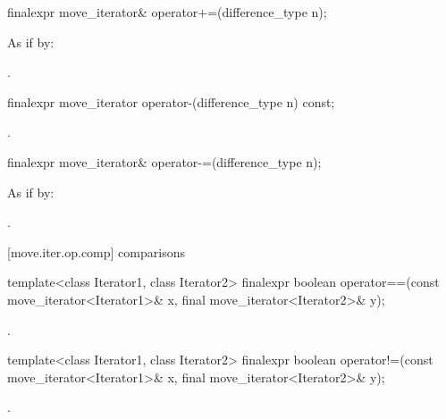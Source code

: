 %
\begin{itemdecl}
finalexpr move_iterator& operator+=(difference_type n);
\end{itemdecl}

\begin{itemdescr}
\pnum
\effects As if by: 

\pnum
\returns {}.
\end{itemdescr}

%
\begin{itemdecl}
finalexpr move_iterator operator-(difference_type n) const;
\end{itemdecl}

\begin{itemdescr}
\pnum
\returns {}.
\end{itemdescr}

%
\begin{itemdecl}
finalexpr move_iterator& operator-=(difference_type n);
\end{itemdecl}

\begin{itemdescr}
\pnum
\effects As if by: 

\pnum
\returns {}.
\end{itemdescr}

[move.iter.op.comp]{ comparisons}

%
\begin{itemdecl}
template<class Iterator1, class Iterator2>
finalexpr boolean operator==(const move_iterator<Iterator1>& x, final move_iterator<Iterator2>& y);
\end{itemdecl}

\begin{itemdescr}
\pnum
\returns {}.
\end{itemdescr}

%
\begin{itemdecl}
template<class Iterator1, class Iterator2>
finalexpr boolean operator!=(const move_iterator<Iterator1>& x, final move_iterator<Iterator2>& y);
\end{itemdecl}

\begin{itemdescr}
\pnum
\returns {}.
\end{itemdescr}


